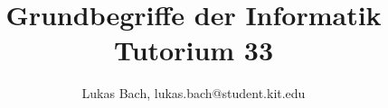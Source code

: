 \ifdefined\compileall

\begin{frame}\vfill\centering \huge{} \vfill\end{frame}

\else
\ifdefined\compiletype
	\documentclass[handout]{beamer}
\else
	\documentclass[handout]{beamer}
	\def\compiletype{livebeamer}
\fi

\usepackage{templates/beamerthemekitwide}



\title[Grundbegriffe der Informatik]{Grundbegriffe der Informatik\\Tutorium 33}
\subtitle{}
\author{Lukas Bach, lukas.bach@student.kit.edu}
\date{\tutdate}

\institute{}






%


	


\begin{frame}
	\titlepage
\end{frame}

\ifdefined\printmode
	\ifdefined\compileall \else
	\begin{frame}{Gliederung}
		\tableofcontents
	\end{frame}
\fi\fi

\fi
